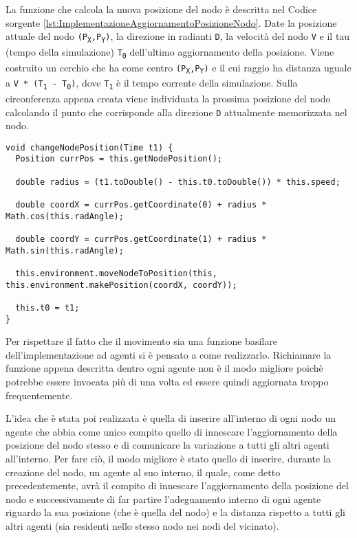 La funzione che calcola la nuova posizione del nodo è descritta nel Codice sorgente \ref{lst:ImplementazioneAggiornamentoPosizioneNodo}. Date la posizione attuale del nodo \texttt{(P\textsubscript{X},P\textsubscript{Y})}, la direzione in radianti \texttt{D}, la velocità del nodo \texttt{V} e il tau (tempo della simulazione) \texttt{T\textsubscript{0}} dell'ultimo aggiornamento della posizione. Viene costruito un cerchio che ha come centro \texttt{(P\textsubscript{X},P\textsubscript{Y})} e il cui raggio ha distanza uguale a \texttt{V * (T\textsubscript{1} - T\textsubscript{0})}, dove \texttt{T\textsubscript{1}} è il tempo corrente della simulazione. Sulla circonferenza appena creata viene individuata la prossima posizione del nodo calcolando il punto che corrisponde alla direzione \texttt{D} attualmente memorizzata nel nodo.

\switchToJava{}{\small}
\begin{lstlisting}[float,firstnumber=1,label={lst:ImplementazioneAggiornamentoPosizioneNodo},caption={Implementazione aggiornamento posizione nodo}]
void changeNodePosition(Time t1) {
  Position currPos = this.getNodePosition();

  double radius = (t1.toDouble() - this.t0.toDouble()) * this.speed;

  double coordX = currPos.getCoordinate(0) + radius * Math.cos(this.radAngle);

  double coordY = currPos.getCoordinate(1) + radius * Math.sin(this.radAngle);

  this.environment.moveNodeToPosition(this, this.environment.makePosition(coordX, coordY));

  this.t0 = t1;
}
\end{lstlisting}

Per rispettare il fatto che il movimento sia una funzione basilare dell'implementazione ad agenti si è pensato a come realizzarlo. Richiamare la funzione appena descritta dentro ogni agente non è il modo migliore poichè potrebbe essere invocata più di una volta ed essere quindi aggiornata troppo frequentemente.

L'idea che è stata poi realizzata è quella di inserire all'interno di ogni nodo un agente che abbia come unico compito quello di innescare l'aggiornamento della posizione del nodo stesso e di comunicare la variazione a tutti gli altri agenti all'interno. Per fare ciò, il modo migliore è stato quello di inserire, durante la creazione del nodo, un agente al suo interno, il quale, come detto precedentemente, avrà il compito di innescare l'aggiornamento della posizione del nodo e successivamente di far partire l'adeguamento interno di ogni agente riguardo la sua posizione (che è quella del nodo) e la distanza rispetto a tutti gli altri agenti (sia residenti nello stesso nodo nei nodi del vicinato).

